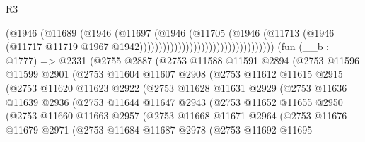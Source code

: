 \begin{lexlean}{R3}
\begin{coremodule}
                                                      (@1946
                                                        (@11689
                                                          (@1946
                                                            (@11697
                                                              (@1946
                                                                (@11705
                                                                  (@1946
                                                                    (@11713
                                                                      (@1946
                                                                        (@11717
                                                                          @11719
                                                                          @1967
                                                                          @1942)))))))))))))))))))))))))))))))))))
    (fun (__b : @1777) =>
    @2331
      (@2755
        @2887
        (@2753
          @11588
          @11591
          @2894
          (@2753
            @11596
            @11599
            @2901
            (@2753
              @11604
              @11607
              @2908
              (@2753
                @11612
                @11615
                @2915
                (@2753
                  @11620
                  @11623
                  @2922
                  (@2753
                    @11628
                    @11631
                    @2929
                    (@2753
                      @11636
                      @11639
                      @2936
                      (@2753
                        @11644
                        @11647
                        @2943
                        (@2753
                          @11652
                          @11655
                          @2950
                          (@2753
                            @11660
                            @11663
                            @2957
                            (@2753
                              @11668
                              @11671
                              @2964
                              (@2753
                                @11676
                                @11679
                                @2971
                                (@2753
                                  @11684
                                  @11687
                                  @2978
                                  (@2753
                                    @11692
                                    @11695

\end{coremodule}
\end{lexlean}
